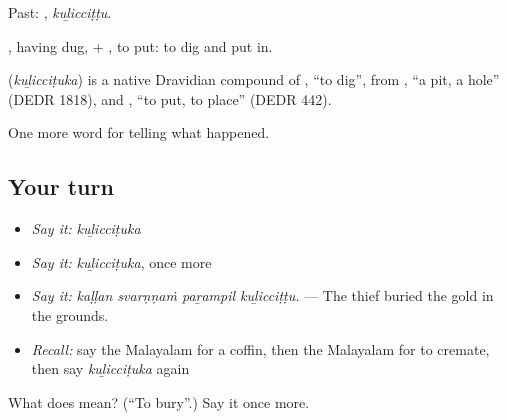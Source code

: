 Past: , \emph{kuḻicciṭṭu}.

, having dug, + , to put: to dig and put in.

\begin{cousinweb}
\textbf{} (\emph{kuḻicciṭuka}) is a native Dravidian compound of , \textquotedblleft{}to dig\textquotedblright{}, from , \textquotedblleft{}a pit, a hole\textquotedblright{} (DEDR 1818), and , \textquotedblleft{}to put, to place\textquotedblright{} (DEDR 442).
\end{cousinweb}

\begin{grammarlens}[title={What you've built}]
One more word for telling what happened.
\end{grammarlens}

\subsection*{Your turn}
\begin{itemize}
\raggedright
  \item \emph{Say it:} \emph{kuḻicciṭuka}
  \item \emph{Say it:} \emph{kuḻicciṭuka}, once more
  \item \emph{Say it:} \emph{kaḷḷan svarṇṇaṁ paṟampil kuḻicciṭṭu.} — The thief buried the gold in the grounds.
  \item \emph{Recall:} say the Malayalam for a coffin, then the Malayalam for to cremate, then say \emph{kuḻicciṭuka} again
\end{itemize}

\begin{tcolorbox}[breakable,colback=teal!4,colframe=teal!35!black,title={Before you move on}]
What does  mean? (\textquotedblleft{}To bury\textquotedblright{}.) Say it once more.
\end{tcolorbox}
